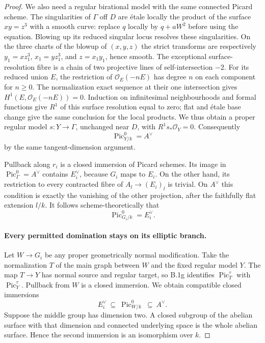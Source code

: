 \begin{proof}
We also need a regular birational model with the same connected
Picard scheme.  The singularities of $\Gamma$ off $D$ are
\'etale locally the product of the surface
$xy=z^3$ with a smooth curve: replace $q$ locally by
$q+aW^2$ before using the equation.  Blowing up its reduced singular
locus resolves these singularities.  On the three charts of
the blowup of $(x,y,z)$ the strict transforms are respectively
$y_1=xz_1^3$, $x_1=yz_1^3$, and $z=x_1y_1$, hence smooth.
The exceptional surface-resolution fibre is a chain of two
projective lines of self-intersection $-2$.
For its reduced union $E$, the restriction of
$\mathcal O_E(-nE)$ has degree $n$ on each component for
$n\ge0$.  The normalization exact sequence at their one
intersection gives $H^1(E,\mathcal O_E(-nE))=0$.
Induction on infinitesimal neighbourhoods and formal functions
give $R^1$ of this surface resolution equal to zero; flat and
\'etale base change give the same conclusion for the local
products.  We thus obtain a proper regular model
$s:Y\to\Gamma$, unchanged near $D$, with
$R^1s_*\mathcal O_Y=0$.  Consequently
\[
                    \operatorname{Pic}^0_{Y/k}=A^\vee
                    \tag{B.2.9}
\]
by the same tangent-dimension argument.

Pullback along $r_i$ is a closed immersion of Picard schemes.
Its image in $\operatorname{Pic}^0_\Gamma=A^\vee$ contains
$E_i^\vee$, because $G_i$ maps to $E_i$.  On the other hand,
its restriction to every contracted fibre of
$A_l\to(E_i)_l$ is trivial.  On $A^\vee$ this condition is
exactly the vanishing of the other projection, after the
faithfully flat extension $l/k$.  It follows scheme-theoretically
that
\[
                    \operatorname{Pic}^0_{G_i/k}=E_i^\vee.
                    \tag{B.2.10}
\]

\paragraph{Every permitted domination stays on its elliptic branch.}
Let $W\to G_i$ be any proper geometrically normal modification.
Take the normalization $T$ of the main graph between $W$ and
the fixed regular model $Y$.  The map $T\to Y$ has normal
source and regular target, so B.1g identifies
$\operatorname{Pic}^{\tau}_T$ with
$\operatorname{Pic}^{\tau}_Y$.  Pullback from $W$ is a closed
immersion.  We obtain compatible closed immersions
\[
       E_i^\vee\ \subseteq\ \operatorname{Pic}^0_{W/k}
              \ \subseteq\ A^\vee.                 \tag{B.2.11}
\]
Suppose the middle group has dimension two.  A closed subgroup
of the abelian surface with that dimension and connected
underlying space is the whole abelian surface.  Hence the
second immersion is an isomorphism over $k$.


\end{proof}
